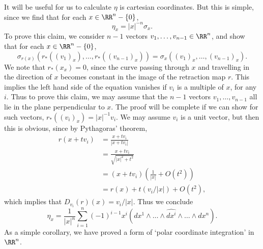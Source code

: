 It will be useful for us to calculate $\eta$ is cartesian coordinates. But this is simple, since we find that for each $x \in \RR^n - \{ 0 \}$,
%
\[ \eta_x = |x|^{-n} \sigma_x. \]
%
To prove this claim, we consider $n-1$ vectors $v_1, \dots, v_{n-1} \in \RR^n$, and show that for each $x \in \RR^n - \{ 0 \}$,
%
\[ \sigma_{r(x)}(r_*((v_1)_x), \dots, r_*((v_{n-1})_x)) = \sigma_x((v_1)_x, \dots, (v_{n-1})_x). \]
%
We note that $r_*(x_x) = 0$, since the curve passing through $x$ and travelling in the direction of $x$ becomes constant in the image of the retraction map $r$. This implies the left hand side of the equation vanishes if $v_i$ is a multiple of $x$, for any $i$. Thus to prove this claim, we may assume that the $n-1$ vectors $v_1, \dots, v_{n-1}$ all lie in the plane perpendicular to $x$. The proof will be complete if we can show for such vectors, $r_*((v_i)_x) = |x|^{-1} v_i$. We may assume $v_i$ is a unit vector, but then this is obvious, since by Pythagoras' theorem,
%
\begin{align*}
    r(x + tv_i) &= \frac{x + tv_i}{|x + tv_i|}\\
    &= \frac{x + tv_i}{\sqrt{|x|^2 + t^2}}\\
    &= (x + tv_i) \left( \frac{1}{|x|} + O(t^2) \right)\\
    &= r(x) + t (v_i/|x|) + O(t^2),
\end{align*}
%
which implies that $D_{v_i}(r)(x) = v_i/|x|$. Thus we conclude
%
\[ \eta_x = \frac{1}{|x|^n} \sum_{i = 1}^n (-1)^{i-1} x^i (dx^1 \wedge \dots \wedge \widehat{dx^i} \wedge \dots \wedge dx^n). \]
%
As a simple corollary, we have proved a form of `polar coordinate integration' in $\RR^n$.

